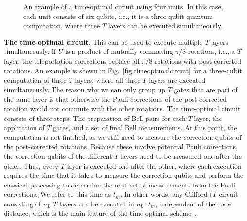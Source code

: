 \documentclass[prx,aps,letterpaper,twocolumn,allowfontchageintitle=true,accepted=2019-02-01]{quantumarticle}
\begin{document}
\begin{figure}[t!]
\centering
\def\svgwidth{0.9\linewidth}

\caption{An example of a time-optimal circuit using four units. In this case, each unit consists of six qubits, i.e., it is a three-qubit quantum computation, where three $T$ layers can be executed simultaneously.}
\label{fig:timeoptimalcircuit2}
\end{figure}

\textbf{The time-optimal circuit.} This can be used to execute multiple $T$ layers simultaneously. If $U$ is a product of mutually commuting $\pi/8$ rotations, i.e., a $T$ layer, the teleportation corrections replace all $\pi/8$ rotations with post-corrected rotations. An example is shown in Fig.~\ref{fig:timeoptimalcircuit} for a three-qubit computation of three $T$ layers, where all three $T$ layers are executed simultaneously. The reason why we can only group up $T$ gates that are part of the same layer is that otherwise the Pauli corrections of the post-corrected rotation would not commute with the other rotations. The time-optimal circuit consists of three steps: The preparation of Bell pairs for each $T$ layer, the application of $T$ gates, and a set of final Bell measurements. At this point, the computation is not finished, as we still need to measure the correction qubits of the post-corrected rotations. Because these involve potential Pauli corrections, the correction qubits of the different $T$ layers need to be measured one after the other. Thus, every $T$ layer is executed one after the other, where each execution requires the time that it takes to measure the correction qubits and perform the classical processing to determine the next set of measurements from the Pauli corrections. We refer to this time as $t_m$. In other words, any Clifford+$T$ circuit consisting of $n_L$ $T$ layers can be executed in $n_L \cdot t_m$, independent of the code distance, which is the main feature of the time-optimal scheme~\cite{Fowler2012a}.
\end{document}
